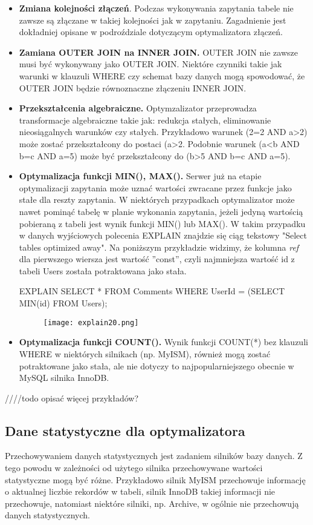 \begin{itemize}
	\item \textbf{Zmiana kolejności złączeń}. Podczas wykonywania zapytania tabele nie zawsze są złączane w takiej kolejności jak w zapytaniu. Zagadnienie jest dokładniej opisane w podroździale dotyczącym optymalizatora złączeń.
	\item \textbf{Zamiana OUTER JOIN na INNER JOIN.} OUTER JOIN nie zawsze musi być wykonywany jako OUTER JOIN. Niektóre czynniki takie jak warunki w klauzuli WHERE czy schemat bazy danych mogą spowodować, że OUTER JOIN będzie równoznaczne złączeniu INNER JOIN. 
	\item \textbf{Przekształcenia algebraiczne.} Optymzalizator przeprowadza transformacje algebraiczne takie jak: redukcja stałych, eliminowanie nieosiągalnych warunków czy stałych. Przykładowo warunek (2=2 AND a>2) może zostać przekształcony do postaci (a>2. Podobnie warunek (a<b AND b=c AND a=5) może być przekształcony do (b>5 AND b=c AND a=5).
	\item \textbf{Optymalizacja funkcji MIN(), MAX().}
	Serwer już na etapie optymalizacji zapytania może uznać wartości zwracane przez funkcje jako stałe dla reszty zapytania. W niektórych przypadkach optymalizator może nawet pominąć tabelę w planie wykonania zapytania, jeżeli jedyną wartością pobieraną z tabeli jest wynik funkcji MIN() lub MAX(). W takim przypadku w danych wyjściowych polecenia EXPLAIN znajdzie się ciąg tekstowy "Select tables optimized away".
	Na poniższym przykładzie widzimy, że kolumna \textit{ref} dla pierwszego wiersza jest wartość ''const'', czyli najmniejsza wartość id z tabeli Users została potraktowana jako stała.
	\begin{spverbatim}
		EXPLAIN SELECT * FROM Comments WHERE UserId = (SELECT MIN(id) FROM Users);
	\end{spverbatim}
	\begin{figure}[H]
		\texttt{[image: explain20.png]} 
	\end{figure}
	\item \textbf{Optymalizacja funkcji COUNT().} Wynik funkcji COUNT(*) bez klauzuli WHERE w niektórych silnikach (np. MyISM), również mogą zostać potraktowane jako stała, ale nie dotyczy to najpopularniejszego obecnie w MySQL silnika InnoDB.
\end{itemize}
////todo opisać więcej przykładów?

\subsection{Dane statystyczne dla optymalizatora}
Przechowywaniem danych statystycznych jest zadaniem silników bazy danych. Z tego powodu w zależności od użytego silnika przechowywane wartości statystyczne mogą być różne. Przykładowo silnik MyISM przechowuje informację o aktualnej liczbie rekordów w tabeli, silnik InnoDB takiej informacji nie przechowuje, natomiast niektóre silniki, np. Archive, w ogólnie nie przechowują danych statystycznych.

 
